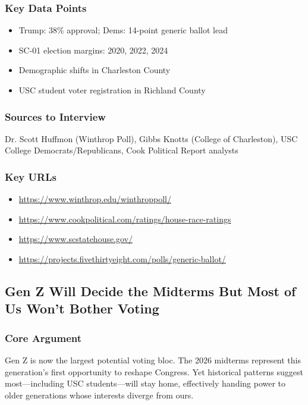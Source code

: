 \documentclass[11pt,letterpaper]{article}
\begin{document}
\subsubsection*{Key Data Points}
\begin{itemize}[noitemsep]
    \item Trump: 38\% approval; Dems: 14-point generic ballot lead
    \item SC-01 election margins: 2020, 2022, 2024
    \item Demographic shifts in Charleston County
    \item USC student voter registration in Richland County
\end{itemize}

\subsubsection*{Sources to Interview}
Dr. Scott Huffmon (Winthrop Poll), Gibbs Knotts (College of Charleston), USC College Democrats/Republicans, Cook Political Report analysts

\subsubsection*{Key URLs}
\begin{itemize}[noitemsep]
    \item \url{https://www.winthrop.edu/winthroppoll/}
    \item \url{https://www.cookpolitical.com/ratings/house-race-ratings}
    \item \url{https://www.scstatehouse.gov/}
    \item \url{https://projects.fivethirtyeight.com/polls/generic-ballot/}
\end{itemize}

\newpage
\subsection{Gen Z Will Decide the Midterms But Most of Us Won't Bother Voting}

\subsubsection*{Core Argument}
Gen Z is now the largest potential voting bloc. The 2026 midterms represent this generation's first opportunity to reshape Congress. Yet historical patterns suggest most---including USC students---will stay home, effectively handing power to older generations whose interests diverge from ours.
\end{document}
